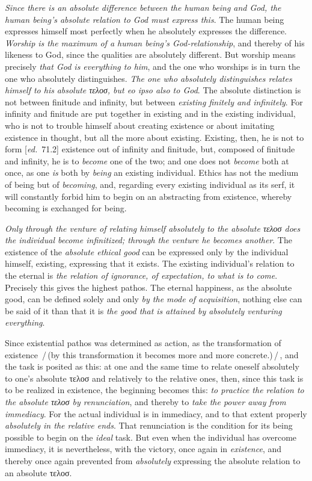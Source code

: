 \documentclass[12pt,a4paper,openany]{book}
\newcommand{\kpage}[1]{\marginnote{\footnotesize\textit{[#1]}}}
\newcommand{\ed}[1]{{\small[\textit{ed.}\ #1]}}
\newcommand{\ins}[1]{\,/\,#1\,/\,}
\begin{document}
\emph{Since there is an absolute difference between the human being and God, the human being's
absolute relation to God must express this}. The human being expresses himself most perfectly
when he absolutely expresses the difference. \emph{Worship is the
maximum of a human being's God-relationship}, and thereby of his likeness to
God, since the qualities are absolutely different. But worship means
precisely \emph{that God is everything to him}, and the one who worships is in turn the
one who absolutely distinguishes. \emph{The one who absolutely distinguishes relates himself to his}
\kpage{140}\emph{absolute τελοσ, but eo ipso also to God}. The absolute distinction
is not between finitude and infinity, but between \emph{existing
finitely and infinitely}. For infinity and finitude are put together in
existing and in the existing individual, who is not to trouble himself
about creating existence or about imitating existence in thought,
but all the more about existing. Existing, then, he is
not to form \ed{71.2} existence out of infinity and finitude, but,
composed of finitude and infinity, he is to \emph{become} one of the two;
and one does not \emph{become} both at once, as one \emph{is} both
by \emph{being} an existing individual. Ethics has not the medium of being but of \emph{becoming},
and, regarding every existing individual as its serf,
it will constantly forbid him to begin on an abstracting from
existence, whereby becoming is exchanged for being.

\emph{Only through the venture of relating himself absolutely to the absolute τελοσ does
the individual become infinitized; through the venture he becomes another}. The existence of the \emph{absolute
ethical good} can be expressed only by the individual himself,
existing, expressing that it exists. The existing individual's relation to the
eternal is \emph{the relation of ignorance, of expectation, to what is to come}. Precisely
this gives the highest pathos. The eternal happiness, as the
absolute good, can be defined solely and only \emph{by the mode of acquisition},
nothing else can be said of it than that it is \emph{the good that is attained
by absolutely venturing everything}.

Since existential pathos was determined as action, as the transformation of
existence \ins{(by this transformation it becomes more
and more concrete.)}, and the task is posited as this: at one and the same time to
relate oneself absolutely to one's absolute τελοσ and relatively to the relative ones,
then, since this task is to be realized in existence, the beginning
becomes this: \emph{to practice the relation to the absolute τελοσ by renunciation}, and thereby
to \emph{take the power away from immediacy}. For the actual individual is in
immediacy, and to that extent properly \emph{absolutely in the relative ends}.
That renunciation is the condition for its being possible to begin on
the \emph{ideal} task. But even when the individual has overcome immediacy,
it is nevertheless, with the victory, once again in \emph{existence}, and thereby once again
prevented from \emph{absolutely} expressing the absolute relation to an absolute
τελοσ.
\end{document}
